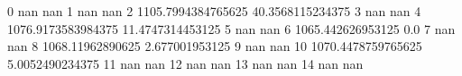 0 nan nan
1 nan nan
2 1105.7994384765625 40.3568115234375
3 nan nan
4 1076.9173583984375 11.4747314453125
5 nan nan
6 1065.442626953125 0.0
7 nan nan
8 1068.11962890625 2.677001953125
9 nan nan
10 1070.4478759765625 5.0052490234375
11 nan nan
12 nan nan
13 nan nan
14 nan nan
